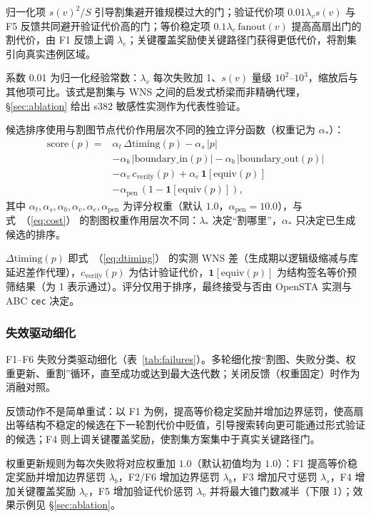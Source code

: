 \documentclass[journal]{IEEEtran}
\renewcommand{\eqref}[1]{\textup{（\ref{#1}）}}
\begin{document}
归一化项 $s(v)^2/S$ 引导割集避开锥规模过大的门；验证代价项 $0.01\lambda_v s(v)$ 与 F5 反馈共同避开验证代价高的门；等价稳定项 $0.1\lambda_e\,\mathrm{fanout}(v)$ 提高高扇出门的割代价，由 F1 反馈上调 $\lambda_e$；关键覆盖奖励使关键路径门获得更低代价，将割集引向真实违例区域。

系数 0.01 为归一化经验常数：$\lambda_v$ 每次失败加 1、$s(v)$ 量级 $10^2$--$10^3$，缩放后与其他项可比。该式是割集与 WNS 之间的启发式桥梁而非精确代理，\S\ref{sec:ablation} 给出 s382 敏感性实测作为代表性验证。

候选排序使用与割图节点代价作用层次不同的独立评分函数（权重记为 $\alpha_*$）：
{\small
\begin{equation}\label{eq:score}
\begin{split}
\mathrm{score}(p) = {}&\alpha_t\,\Delta\mathrm{timing}(p) - \alpha_s\,|p| \\
&- \alpha_b\,|\mathrm{boundary\_in}(p)| - \alpha_b\,|\mathrm{boundary\_out}(p)| \\
&- \alpha_v\,c_{\mathrm{verify}}(p) + \alpha_e\,\mathbf{1}[\mathrm{equiv}(p)] \\
&- \alpha_{\mathrm{pen}}\,(1-\mathbf{1}[\mathrm{equiv}(p)]),
\end{split}
\end{equation}
}
其中 $\alpha_t,\alpha_s,\alpha_b,\alpha_v,\alpha_e,\alpha_{\mathrm{pen}}$ 为评分权重（默认 $1.0$，$\alpha_{\mathrm{pen}}=10.0$），与式~\eqref{eq:cost} 的割图权重作用层次不同：$\lambda_*$ 决定“割哪里”，$\alpha_*$ 只决定已生成候选的排序。

$\Delta\mathrm{timing}(p)$ 即式~\eqref{eq:dtiming} 的实测 WNS 差（生成期以逻辑级缩减与库延迟差作代理），$c_{\mathrm{verify}}(p)$ 为估计验证代价，$\mathbf{1}[\mathrm{equiv}(p)]$ 为结构签名等价预筛结果（为 1 表示通过）。评分仅用于排序，最终接受与否由 OpenSTA 实测与 ABC \texttt{cec} 决定。

\subsubsection{失效驱动细化}
F1--F6 失败分类驱动细化（表~\ref{tab:failures}）。多轮细化按“割图、失败分类、权重更新、重割”循环，直至成功或达到最大迭代数；关闭反馈（权重固定）时作为消融对照。

反馈动作不是简单重试：以 F1 为例，提高等价稳定奖励并增加边界惩罚，使高扇出等结构不稳定的候选在下一轮割代价中贬值，引导搜索转向更可能通过形式验证的候选；F4 则上调关键覆盖奖励，使割集方案集中于真实关键路径门。

权重更新规则为每次失败将对应权重加 $1.0$（默认初值均为 $1.0$）：F1 提高等价稳定奖励并增加边界惩罚 $\lambda_b$，F2/F6 增加边界惩罚 $\lambda_b$，F3 增加尺寸惩罚 $\lambda_s$，F4 增加关键覆盖奖励 $\lambda_c$，F5 增加验证代价惩罚 $\lambda_v$ 并将最大锥门数减半（下限 1）；效果示例见 \S\ref{sec:ablation}。
\end{document}
